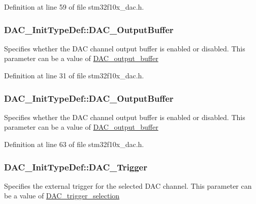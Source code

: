 Definition at line 59 of file stm32f10x\+\_\+dac.\+h.

\subsubsection[{\texorpdfstring{D\+A\+C\+\_\+\+Output\+Buffer}{DAC_OutputBuffer}}]{ D\+A\+C\+\_\+\+Init\+Type\+Def\+::\+D\+A\+C\+\_\+\+Output\+Buffer}\hypertarget{struct_d_a_c___init_type_def_a3d7a53937aa3af44848927cffb119a6f}{}\label{struct_d_a_c___init_type_def_a3d7a53937aa3af44848927cffb119a6f}
Specifies whether the D\+AC channel output buffer is enabled or disabled. This parameter can be a value of \hyperlink{group___d_a_c__output__buffer}{D\+A\+C\+\_\+output\+\_\+buffer} 

Definition at line 31 of file stm32f10x\+\_\+dac.\+h.

\subsubsection[{\texorpdfstring{D\+A\+C\+\_\+\+Output\+Buffer}{DAC_OutputBuffer}}]{ D\+A\+C\+\_\+\+Init\+Type\+Def\+::\+D\+A\+C\+\_\+\+Output\+Buffer}\hypertarget{struct_d_a_c___init_type_def_ad3e9e01486443e99f19e65a446b03ca6}{}\label{struct_d_a_c___init_type_def_ad3e9e01486443e99f19e65a446b03ca6}
Specifies whether the D\+AC channel output buffer is enabled or disabled. This parameter can be a value of \hyperlink{group___d_a_c__output__buffer}{D\+A\+C\+\_\+output\+\_\+buffer} 

Definition at line 63 of file stm32f10x\+\_\+dac.\+h.

\subsubsection[{\texorpdfstring{D\+A\+C\+\_\+\+Trigger}{DAC_Trigger}}]{ D\+A\+C\+\_\+\+Init\+Type\+Def\+::\+D\+A\+C\+\_\+\+Trigger}\hypertarget{struct_d_a_c___init_type_def_a795b4b118c54c233afe81237a886817d}{}\label{struct_d_a_c___init_type_def_a795b4b118c54c233afe81237a886817d}
Specifies the external trigger for the selected D\+AC channel. This parameter can be a value of \hyperlink{group___d_a_c__trigger__selection}{D\+A\+C\+\_\+trigger\+\_\+selection} 

